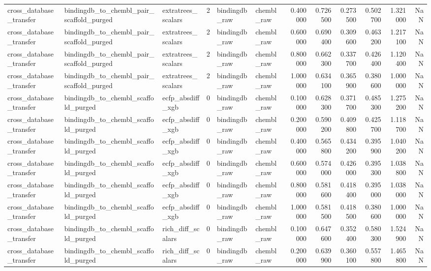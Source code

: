 \begin{longtable}{lllrllrrrrrr}
cross\_database\_transfer & bindingdb\_to\_chembl\_pair\_scaffold\_purged & extratrees\_scalars & 2 & bindingdb\_raw & chembl\_raw & 0.400000 & 0.726500 & 0.273500 & 0.502700 & 1.321000 & NaN \\
cross\_database\_transfer & bindingdb\_to\_chembl\_pair\_scaffold\_purged & extratrees\_scalars & 2 & bindingdb\_raw & chembl\_raw & 0.600000 & 0.690400 & 0.309600 & 0.463200 & 1.217100 & NaN \\
cross\_database\_transfer & bindingdb\_to\_chembl\_pair\_scaffold\_purged & extratrees\_scalars & 2 & bindingdb\_raw & chembl\_raw & 0.800000 & 0.662300 & 0.337700 & 0.426400 & 1.120400 & NaN \\
cross\_database\_transfer & bindingdb\_to\_chembl\_pair\_scaffold\_purged & extratrees\_scalars & 2 & bindingdb\_raw & chembl\_raw & 1.000000 & 0.634100 & 0.365900 & 0.380600 & 1.000000 & NaN \\
cross\_database\_transfer & bindingdb\_to\_chembl\_scaffold\_purged & ecfp\_absdiff\_xgb & 0 & bindingdb\_raw & chembl\_raw & 0.100000 & 0.628300 & 0.371700 & 0.485300 & 1.275200 & NaN \\
cross\_database\_transfer & bindingdb\_to\_chembl\_scaffold\_purged & ecfp\_absdiff\_xgb & 0 & bindingdb\_raw & chembl\_raw & 0.200000 & 0.590200 & 0.409800 & 0.425700 & 1.118700 & NaN \\
cross\_database\_transfer & bindingdb\_to\_chembl\_scaffold\_purged & ecfp\_absdiff\_xgb & 0 & bindingdb\_raw & chembl\_raw & 0.400000 & 0.565800 & 0.434200 & 0.395900 & 1.040200 & NaN \\
cross\_database\_transfer & bindingdb\_to\_chembl\_scaffold\_purged & ecfp\_absdiff\_xgb & 0 & bindingdb\_raw & chembl\_raw & 0.600000 & 0.574000 & 0.426000 & 0.395300 & 1.038800 & NaN \\
cross\_database\_transfer & bindingdb\_to\_chembl\_scaffold\_purged & ecfp\_absdiff\_xgb & 0 & bindingdb\_raw & chembl\_raw & 0.800000 & 0.581600 & 0.418400 & 0.395000 & 1.038000 & NaN \\
cross\_database\_transfer & bindingdb\_to\_chembl\_scaffold\_purged & ecfp\_absdiff\_xgb & 0 & bindingdb\_raw & chembl\_raw & 1.000000 & 0.581500 & 0.418500 & 0.380600 & 1.000000 & NaN \\
cross\_database\_transfer & bindingdb\_to\_chembl\_scaffold\_purged & rich\_diff\_scalars & 0 & bindingdb\_raw & chembl\_raw & 0.100000 & 0.647600 & 0.352400 & 0.580300 & 1.524900 & NaN \\
cross\_database\_transfer & bindingdb\_to\_chembl\_scaffold\_purged & rich\_diff\_scalars & 0 & bindingdb\_raw & chembl\_raw & 0.200000 & 0.639900 & 0.360100 & 0.557800 & 1.465800 & NaN \\

\end{longtable}
